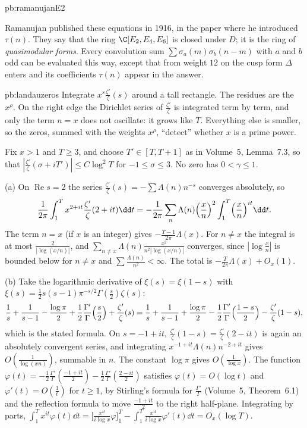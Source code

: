 \begin{solution}{pb:ramanujanE2}

\leads Ramanujan published these equations in 1916, in the paper where he introduced $\tau(n)$. They say that the ring $\C[E_2,E_4,E_6]$ is closed under $D$; it is the ring of
\emph{quasimodular forms}. Every convolution sum $\sum\sigma_a(m)\sigma_b(n-m)$ with $a$ and $b$ odd can be evaluated this way, except that from weight $12$ on the cusp form $\Delta$
enters and its coefficients $\tau(n)$ appear in the answer.
\end{solution}

\begin{solution}{pb:landauzeros}
\idea Integrate $x^s\frac{\zeta'}\zeta(s)$ around a tall rectangle. The residues are the $x^\rho$. On the right edge the Dirichlet series of $\frac{\zeta'}\zeta$ is integrated term by term,
and only the term $n=x$ does not oscillate: it grows like $T$. Everything else is smaller, so the zeros, summed with the weights $x^\rho$, ``detect'' whether $x$ is a prime power.

\writeup Fix $x>1$ and $T\ge3$, and choose $T'\in[T,T+1]$ as in Volume~5, Lemma~7.3, so that $|\frac{\zeta'}\zeta(\sigma+iT')|\le C\log^2T$ for $-1\le\sigma\le3$. No zero has $0<\gamma\le1$.

(a) On $\operatorname{Re}s=2$ the series $\frac{\zeta'}\zeta(s)=-\sum\Lambda(n)n^{-s}$ converges absolutely, so
\[
\frac1{2\pi}\int_1^Tx^{2+it}\frac{\zeta'}\zeta(2+it)\dd t=-\frac1{2\pi}\sum_n\Lambda(n)\Bigl(\frac xn\Bigr)^2\int_1^T\Bigl(\frac xn\Bigr)^{it}\dd t.
\]
The term $n=x$ (if $x$ is an integer) gives $-\frac{T-1}{2\pi}\Lambda(x)$. For $n\ne x$ the integral is at most $\frac2{|\log(x/n)|}$, and $\sum_{n\ne x}\Lambda(n)\frac{x^2}{n^2|\log(x/n)|}$
converges, since $|\log\frac xn|$ is bounded below for $n\ne x$ and $\sum\frac{\Lambda(n)}{n^2}<\infty$. The total is $-\frac T{2\pi}\Lambda(x)+O_x(1)$.

(b) Take the logarithmic derivative of $\xi(s)=\xi(1-s)$ with $\xi(s)=\frac12s(s-1)\pi^{-s/2}\Gamma(\frac s2)\zeta(s)$:
\[
\frac1s+\frac1{s-1}-\frac{\log\pi}2+\frac12\frac{\Gamma'}\Gamma\Bigl(\frac s2\Bigr)+\frac{\zeta'}\zeta(s)=\frac1s+\frac1{s-1}+\frac{\log\pi}2-\frac12\frac{\Gamma'}\Gamma\Bigl(\frac{1-s}2\Bigr)-\frac{\zeta'}\zeta(1-s),
\]
which is the stated formula. On $s=-1+it$, $\frac{\zeta'}\zeta(1-s)=\frac{\zeta'}\zeta(2-it)$ is again an absolutely convergent series, and integrating $x^{-1+it}\Lambda(n)n^{-2+it}$ gives
$O(\frac1{\log(xn)})$, summable in $n$. The constant $\log\pi$ gives $O(\frac1{\log x})$. The function $\varphi(t)=-\frac12\frac{\Gamma'}\Gamma(\frac{-1+it}2)-\frac12\frac{\Gamma'}\Gamma(\frac{2-it}2)$ satisfies
$\varphi(t)=O(\log t)$ and $\varphi'(t)=O(\frac1t)$ for $t\ge1$, by Stirling's formula for $\frac{\Gamma'}\Gamma$ (Volume~5, Theorem~6.1) and the reflection formula to move
$\frac{-1+it}2$ to the right half-plane. Integrating by parts,
$\int_1^{T}x^{it}\varphi(t)\dd t=\bigl[\frac{x^{it}}{i\log x}\varphi\bigr]_1^{T}-\int_1^{T}\frac{x^{it}}{i\log x}\varphi'(t)\dd t=O_x(\log T)$.


\end{solution}

